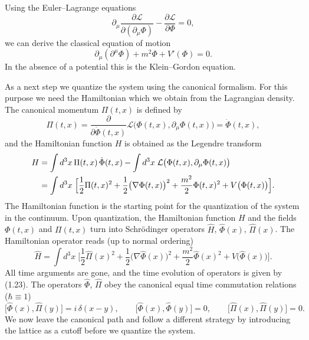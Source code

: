 Using the Euler--Lagrange equations
\begin{equation}
  \partial_\mu\frac{\partial\mathcal{L}}{\partial(\partial_\mu\Phi)}
  - \frac{\partial\mathcal{L}}{\partial\Phi} = 0,
\end{equation}
we can derive the classical equation of motion
\begin{equation}
  \partial_\mu(\partial^\mu\Phi) + m^2\Phi + V'(\Phi) = 0.
\end{equation}
In the absence of a potential this is the Klein--Gordon equation.

As a next step we quantize the system using the canonical formalism. For this
purpose we need the Hamiltonian which we obtain from the Lagrangian density.
The canonical momentum $\Pi(t,x)$ is defined by
\begin{equation}
  \Pi(t,x) = \frac{\partial}{\partial\dot{\Phi}(t,x)}
    \mathcal{L}\big(\Phi(t,x), \partial_\mu\Phi(t,x)\big) = \dot{\Phi}(t,x),
\end{equation}
and the Hamiltonian function $H$ is obtained as the Legendre transform
\begin{align}
  H &= \int d^3x\,\Pi(t,x)\,\dot{\Phi}(t,x)
      - \int d^3x\;\mathcal{L}\big(\Phi(t,x), \partial_\mu\Phi(t,x)\big) \notag\\
    &= \int d^3x\;\Big[\frac{1}{2}\Pi(t,x)^2
       + \frac{1}{2}\big(\nabla\Phi(t,x)\big)^2
       + \frac{m^2}{2}\Phi(t,x)^2 + V\big(\Phi(t,x)\big)\Big].
\end{align}
The Hamiltonian function is the starting point for the quantization of the
system in the continuum. Upon quantization, the Hamiltonian function $H$ and
the fields $\Phi(t,x)$ and $\Pi(t,x)$ turn into Schr\"odinger operators
$\hat{H}$, $\hat{\Phi}(x)$, $\hat{\Pi}(x)$. The Hamiltonian operator reads (up
to normal ordering)
\begin{equation}
  \hat{H} = \int d^3x\;\Big[\frac{1}{2}\hat{\Pi}(x)^2
    + \frac{1}{2}\big(\nabla\hat{\Phi}(x)\big)^2
    + \frac{m^2}{2}\hat{\Phi}(x)^2 + V\big(\hat{\Phi}(x)\big)\Big].
\end{equation}
All time arguments are gone, and the time evolution of operators is given by
(1.23). The operators $\hat{\Phi}$, $\hat{\Pi}$ obey the canonical equal time
commutation relations ($\hbar \equiv 1$)
\begin{equation}
  \big[\hat{\Phi}(x), \hat{\Pi}(y)\big] = i\,\delta(x-y), \qquad
  \big[\hat{\Phi}(x), \hat{\Phi}(y)\big] = 0, \qquad
  \big[\hat{\Pi}(x), \hat{\Pi}(y)\big] = 0.
\end{equation}
We now leave the canonical path and follow a different strategy by introducing
the lattice as a cutoff before we quantize the system.

